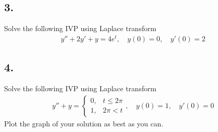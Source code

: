 \subsection*{3. }
Solve the following IVP using Laplace transform
\begin{align*}
	y'' + 2y' + y =4e^t, \quad y(0) = 0, \quad y'(0) = 2
\end{align*}
\vspace{0.5em}

\subsection*{4. }
Solve the following IVP using Laplace transform
\begin{align*}
	y'' + y = \begin{cases} 0, & t \le 2\pi \\ 1, & 2 \pi < t \end{cases}, \quad y(0) = 1, \quad y'(0) = 0
\end{align*}
Plot the graph of your solution as best as you can.
\vspace{2em}





